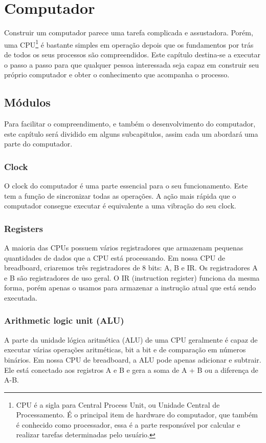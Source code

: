 \section{Computador} 
Construir um computador parece uma tarefa complicada e assustadora. Porém, uma CPU\footnote{CPU é a sigla para Central Process Unit, ou Unidade Central de Processamento. É o principal item de hardware do computador, que também é conhecido como processador, essa é a parte responsável por calcular e realizar tarefas determinadas pelo usuário.} é bastante simples em operação depois que os fundamentos por trás de todos os seus processos são compreendidos. Este capítulo destina-se a executar o passo a passo para que qualquer pessoa interessada seja capaz em construir seu próprio computador e obter o conhecimento que acompanha o processo.

\subsection{Módulos}
Para facilitar o compreendimento, e também o desenvolvimento do computador, este capítulo será dividido em alguns subcapitulos, assim cada um abordará uma parte do computador. 

\subsubsection{Clock}
O clock do computador é uma parte essencial para o seu funcionamento. Este tem a função de sincronizar todas as operações. A ação mais rápida que o computador consegue executar é equivalente a uma vibração do seu clock.

\subsubsection{Registers}
A maioria das CPUs possuem vários registradores que armazenam pequenas quantidades de dados que a CPU está processando. Em nossa CPU de breadboard, criaremos três registradores de 8 bits: A, B e IR. Os registradores A e B são registradores de uso geral. O IR (instruction register) funciona da mesma forma, porém apenas o usamos para armazenar a instrução atual que está sendo executada.

\subsubsection{Arithmetic logic unit (ALU)}
A parte da unidade lógica aritmética (ALU) de uma CPU geralmente é capaz de executar várias operações aritméticas, bit a bit e de comparação em números binários. Em nossa CPU de breadboard, a ALU pode apenas adicionar e subtrair. Ele está conectado aos registros A e B e gera a soma de A + B ou a diferença de A-B.

